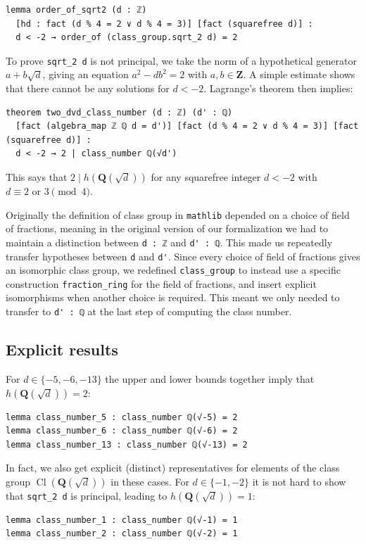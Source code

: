 \documentclass[sigplan,10pt,nonacm,
screen]{acmart} \settopmatter{printfolios=true,printccs=false,printacmref=false}
\newcommand{\mathlib}{\lstinline{mathlib}\xspace}
\newcommand{\QQ}{\mathbf{Q}}
\newcommand{\ZZ}{\mathbf{Z}}
\DeclareMathOperator{\Cl}{Cl}
\begin{document}
\begin{lstlisting}
lemma order_of_sqrt2 (d : ℤ)
  [hd : fact (d % 4 = 2 ∨ d % 4 = 3)] [fact (squarefree d)] :
  d < -2 → order_of (class_group.sqrt_2 d) = 2
\end{lstlisting}

To prove \lstinline{sqrt_2 d} is not principal, we take the norm of a hypothetical generator $a + b\sqrt{d}$, giving an equation $a^2 - d b^2 = 2$ with $a, b \in \ZZ$.
A simple estimate shows that there cannot be any solutions for $d < -2$.
Lagrange's theorem then implies:
\begin{lstlisting}
theorem two_dvd_class_number (d : ℤ) (d' : ℚ)
  [fact (algebra_map ℤ ℚ d = d')] [fact (d % 4 = 2 ∨ d % 4 = 3)] [fact (squarefree d)] :
  d < -2 → 2 | class_number ℚ(√d')
\end{lstlisting}
This says that $2 \mid h(\QQ(\sqrt{d}))$ for any squarefree integer $d<-2$ with $d \equiv 2 \text{ or } 3 \pmod{4}$.

Originally the definition of class group in \mathlib depended on a choice of field of fractions,
meaning in the original version of our formalization we had to maintain a distinction between \lstinline{d : ℤ} and \lstinline{d' : ℚ}.
This made us repeatedly transfer hypotheses between \lstinline{d} and \lstinline{d'}.
Since every choice of field of fractions gives an isomorphic class group,
we redefined \lstinline{class_group} to instead use a specific construction \lstinline{fraction_ring} for the field of fractions,
and insert explicit isomorphisms when another choice is required.
This meant we only needed to transfer to \lstinline{d' : ℚ} at the last step of computing the class number.

\subsection{Explicit results}\label{sec:class_group_expl}

For $d\in\{-5,-6,-13\}$ the upper and lower bounds together imply that $h(\QQ(\sqrt{d}))=2$:
\begin{lstlisting}
lemma class_number_5 : class_number ℚ(√-5) = 2
lemma class_number_6 : class_number ℚ(√-6) = 2
lemma class_number_13 : class_number ℚ(√-13) = 2
\end{lstlisting}

In fact, we also get explicit (distinct) representatives for elements of the class group $\Cl(\QQ(\sqrt{d}))$ in these cases. For $d \in \{-1,-2\}$ it is not hard to show that \lstinline{sqrt_2 d} is principal, leading to $h(\QQ(\sqrt{d}))=1$:
\begin{lstlisting}
lemma class_number_1 : class_number ℚ(√-1) = 1
lemma class_number_2 : class_number ℚ(√-2) = 1
\end{lstlisting}
\end{document}
